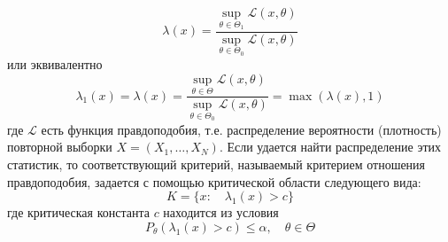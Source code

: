 \documentclass[A4]{article}
\begin{document}
\begin{enumerate}
\begin{enumerate}
\begin{equation}
		\lambda(x)=\frac{\sup_{\theta\in\Theta_1} \mathcal{L}(x,\theta)}{\sup_{\theta\in\Theta_0} \mathcal{L}(x,\theta)}
		\end{equation} 
		или эквивалентно
		\begin{equation}
		\lambda_1(x)=\lambda(x)=\frac{\sup_{\theta\in\Theta} \mathcal{L}(x,\theta)}{\sup_{\theta\in\Theta_0} \mathcal{L}(x,\theta)}=\max(\lambda(x),1)
		\end{equation}
		где $\mathcal{L}$ есть функция правдоподобия, т.е. распределение вероятности (плотность) повторной выборки $X=(X_1,\ldots,X_N)$. Если удается найти распределение этих статистик, то соответствующий критерий, называемый критерием отношения правдоподобия, задается с помощью критической области следующего вида: 
		\begin{equation}
		K=\{x:\quad \lambda_1(x)>c\}
		\end{equation}
		где критическая константа $c$ находится из условия
		\begin{equation}
		P_{\theta}(\lambda_1(x)>c)\le\alpha,\quad\theta\in\Theta
		\end{equation}
	\end{enumerate}
\end{enumerate}
\end{document}

